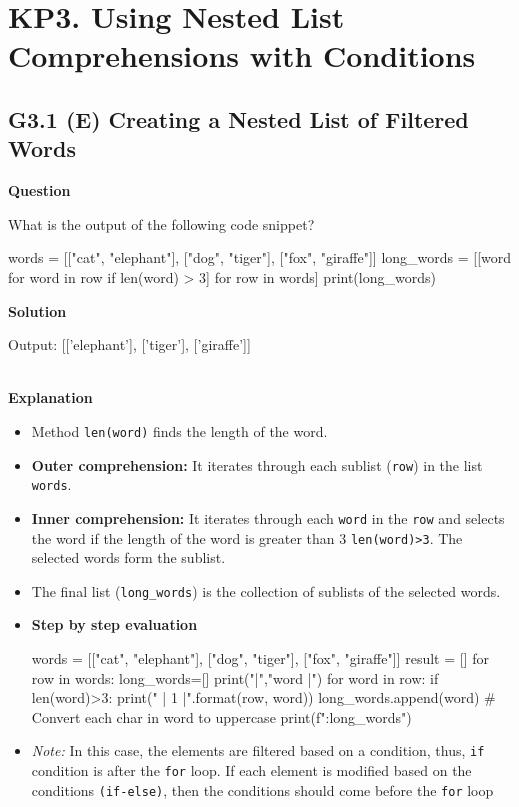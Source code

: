 \documentclass[10pt]{extarticle}
\begin{document}
\section*{KP3. Using Nested List Comprehensions with Conditions}
\subsection*{G3.1 (E) Creating a Nested List of Filtered Words}

\textbf{Question}

What is the output of the following code snippet?

    \begin{python}
    words = [["cat", "elephant"], ["dog", "tiger"], ["fox", "giraffe"]]
    long_words = [[word for word in row if len(word) > 3] for row in words]
    print(long_words)
    \end{python}

\noindent\textbf{Solution}

\begin{python}
Output: [['elephant'], ['tiger'], ['giraffe']]
\end{python}  \\

\noindent\textbf{Explanation}

\begin{itemize}
    \item Method \colorbox{gray!20}{\texttt{len(word)}} finds the length of the word.
    \item \textbf{Outer comprehension:} It iterates through each sublist (\texttt{row}) in the list \texttt{words}.
    \item \textbf{Inner comprehension:} It iterates through each \texttt{word} in the \texttt{row} and selects the word if the length of the word is greater than $3$ \colorbox{gray!20}{\texttt{len(word)>3}}.
    The selected words form the sublist.
    \item The final list (\texttt{long\_words}) is the collection of sublists of the selected words.
    \item \textbf{Step by step evaluation}
    \begin{tcolorbox}[colback=gray!20, colframe=gray!50, sharp corners=southwest]
    \begin{pycode}
words = [["cat", "elephant"], ["dog", "tiger"], ["fox", "giraffe"]]
result = []
for row in words:
  long_words=[]
  print("\nrow |","word |")
  for word in row:
    if len(word)>3:
          print(" | {1} |".format(row, word))
          long_words.append(word) 
           # Convert each char in word to uppercase
  print(f"\nSublist:{long_words}")  

    \end{pycode}
    \end{tcolorbox}
    \item \textit{Note:} In this case, the elements are filtered based on a condition, thus, \texttt{if} condition is after the \texttt{for} loop.
    If each element is modified based on the conditions \texttt{(if-else)}, then the conditions should come before the \texttt{for} loop 
\end{itemize}
\end{document}
